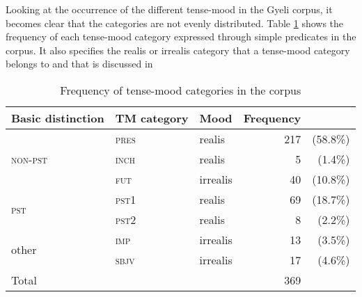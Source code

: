 \begin{table}[!h]
\centering
{}
\caption{Verb tone patterns in different TM categories by phonological verb set}
\label{Tab:TM-verbs}
\end{table} 

Looking at the occurrence of the different tense-mood in the Gyeli corpus, it becomes clear that the categories are not evenly distributed.  Table \ref{Tab:TMFreq} shows the frequency of each tense-mood category expressed through simple predicates in the corpus. It also specifies the realis or irrealis category that a tense-mood category belongs to and that is discussed in 

\begin{table}[!h]
\centering
\begin{tabular}{|l|l|lrr|}
 \midrule
Basic distinction & TM category & Mood & Frequency &   \\
 \midrule
 & \textsc{pres} & realis &  217 & (58.8\%) \\
\textsc{non-pst} & \textsc{inch} & realis & 5 & (1.4\%) \\ 
 & \textsc{fut} & irrealis &  40 & (10.8\%) \\
 \midrule
\multirow{2}{*}{\textsc{pst}} &  \textsc{pst1} & realis &  69 & (18.7\%) \\
 & \textsc{pst2} & realis & 8 & (2.2\%) \\
 \midrule
\multirow{2}{*}{other} & \textsc{imp} & irrealis &  13 & (3.5\%) \\ 
 & \textsc{sbjv} & irrealis  & 17 & (4.6\%) \\
 \midrule
Total & & & 369 & \\
 \midrule
\end{tabular}
\caption{Frequency of tense-mood categories in the corpus}
\label{Tab:TMFreq}
\end{table}

